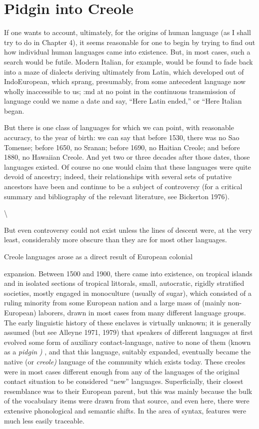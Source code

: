 \chapter{Pidgin into Creole}

If one wants to account, ultimately, for the origins of human language (as I shall try to do in Chapter 4), it seems reasonable for one to begin by trying to find out how individual human languages came into existence. But, in most cases, such a search would be futile. Mod\-ern Italian, for example, would be found to fade back into a maze of dialects deriving ultimately from Latin, which developed out of Indo\-European, which sprang, presumably, from some antecedent language now wholly inaccessible to us; :md at no point in the continuous transmission of language could we name a date and say, ``Here Latin ended,'' or ``Here Italian began.{\textquotedbl}

But there is one class of languages for which we can point, with reasonable accuracy, to the year of birth: we can say that before 1530, there was no Sao Tomense; before 1650, no Sranan; before 1690, no Haitian Creole; and before 1880, no Hawaiian Creole. And yet two or three decades after those dates, those languages existed. Of course no one would claim that these languages were quite devoid of ancestry; indeed, their relationships with several sets of putative ancestors have been and continue to be a subject of controversy (for a critical sum\-mary and bibliography of the relevant literature, see Bickerton 1976).

{\textbackslash}


But even controversy could not exist unless the lines of descent were, at the very least, considerably more obscure than they are for most other languages.

Creole languages arose as a direct result of European colonial

expansion. Between 1500 and 1900, there came into existence, on tropical islands and in isolated sections of tropical littorals, small, autocratic, rigidly stratified societies, mostly engaged in monoculture (usually of sugar), which consisted of a ruling minority from some European nation and a large mass of (mainly non-European) laborers, drawn in most cases from many different language groups. The early linguistic history of these enclaves is virtually unknown; it is generally assumed (but see Alleyne 1971, 1979) that speakers of different lan\-guages at first evolved some form of auxiliary contact-language, native to none of them (known as a \textit{pidgin} \textit{)} , and that this language, suitably expanded, eventually became the native (or \textit{creol}\textit{e}\textit{) }language of the community which exists today. These creoles were in most cases different enough from any of the languages of the original contact situation to be considered ``new'' languages. Superficially, their closest resemblance was to their European parent, but this was mainly because the bulk of the vocabulary items were drawn from that source, and even here, there were extensive phonological and semantic shifts. In the area of syntax, features were much less easily traceable.


